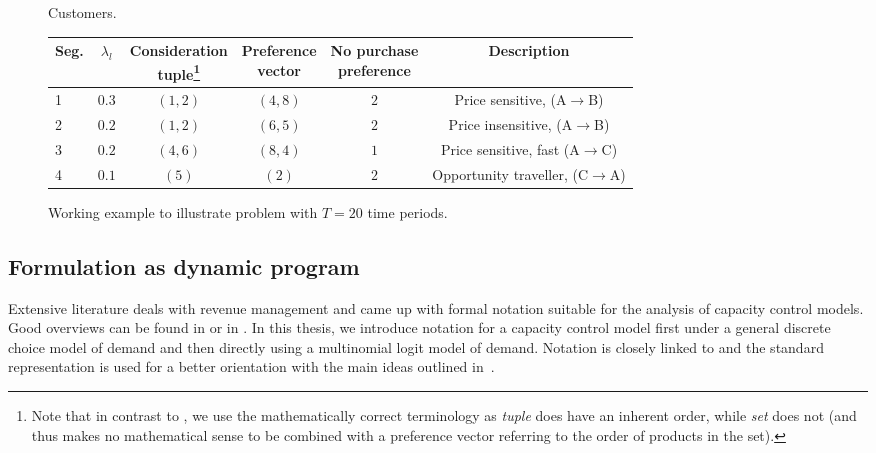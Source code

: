 \begin{figure}
	\begin{subtable}{\linewidth}
		\caption{Customers.\label{tb:AirDesc:Cust}}
		\small
		\centering
		\begin{tabular}{lccccc}
			\toprule
			Seg. & $\lambda_l$ & \specialcell[b]{Consideration\\tuple\footnote{Note that in contrast to \cite{Bront.2009}, we use the mathematically correct terminology as \emph{tuple} does have an inherent order, while \emph{set} does not (and thus makes no mathematical sense to be combined with a preference vector referring to the order of products in the set).}} & \specialcell[b]{Preference \\vector} & \specialcell[b]{No purchase \\preference} & Description\\
			\midrule
			1 & $0.3$ & $(1, 2)$ & $(4, 8)$ & $2$ & Price sensitive, (A$\rightarrow$B)\\
			2 & $0.2$ & $(1, 2)$ & $(6, 5)$ & $2$ & Price insensitive, (A$\rightarrow$B)\\
			3 & $0.2$ & $(4, 6)$ & $(8, 4)$ & $1$ & Price sensitive, fast (A$\rightarrow$C)\\
			4 & $0.1$ & $(5)$ & $(2)$ & $2$ & Opportunity traveller, (C$\rightarrow$A)\\
			\bottomrule
		\end{tabular}
	\end{subtable}
	\caption{Working example to illustrate problem with $T=20$ time periods.}
\end{figure}


\subsection{Formulation as dynamic program}\label{ss:Prob:FormDynProg}


Extensive literature deals with revenue management and came up with formal notation suitable for the analysis of capacity control models. Good overviews can be found in \cite{Klein.2008} or in \cite{Phillips.2011}. In this thesis, we introduce notation for a capacity control model first under a general discrete choice model of demand and then directly using a multinomial logit model of demand. Notation is closely linked to \cite{Koch.2017} and the standard representation is used for a better orientation with the main ideas outlined in \,.

